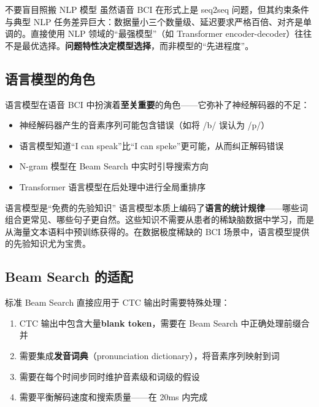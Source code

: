 \documentclass[a4paper]{article}
\begin{document}
\begin{warningbox}{不要盲目照搬 NLP 模型}
虽然语音 BCI 在形式上是 seq2seq 问题，但其约束条件与典型 NLP 任务差异巨大：数据量小三个数量级、延迟要求严格百倍、对齐是单调的。直接使用 NLP 领域的``最强模型''（如 Transformer encoder-decoder）往往不是最优选择。\textbf{问题特性决定模型选择}，而非模型的``先进程度''。
\end{warningbox}

\subsection{语言模型的角色}

语言模型在语音 BCI 中扮演着\textbf{至关重要}的角色——它弥补了神经解码器的不足：

\begin{itemize}
    \item 神经解码器产生的音素序列可能包含错误（如将 /b/ 误认为 /p/）
    \item 语言模型知道``I can speak''比``I can speke''更可能，从而纠正解码错误
    \item N-gram 模型在 Beam Search 中实时引导搜索方向
    \item Transformer 语言模型在后处理中进行全局重排序
\end{itemize}

\begin{importantbox}{语言模型是``免费的先验知识''}
语言模型本质上编码了\textbf{语言的统计规律}——哪些词组合更常见、哪些句子更自然。这些知识不需要从患者的稀缺脑数据中学习，而是从海量文本语料中预训练获得的。在数据极度稀缺的 BCI 场景中，语言模型提供的先验知识尤为宝贵。
\end{importantbox}

\subsection{Beam Search 的适配}

标准 Beam Search 直接应用于 CTC 输出时需要特殊处理：

\begin{enumerate}
    \item CTC 输出中包含大量\textbf{blank token}，需要在 Beam Search 中正确处理前缀合并
    \item 需要集成\textbf{发音词典}（pronunciation dictionary），将音素序列映射到词
    \item 需要在每个时间步同时维护音素级和词级的假设
    \item 需要平衡解码速度和搜索质量——在 20ms 内完成
\end{enumerate}
\end{document}

